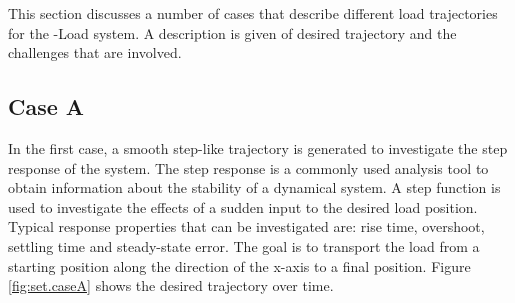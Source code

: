 
This section discusses a number of cases that describe different load trajectories for the -Load system.
A description is given of desired trajectory and the challenges that are involved.

\subsection*{Case A}



In the first case, a smooth step-like trajectory is generated to investigate the step response of the system.
The step response is a commonly used analysis tool to obtain information about the stability of a dynamical system.
A step function is used to investigate the effects of a sudden input to the desired load position.
Typical response properties that can be investigated are: rise time, overshoot, settling time and steady-state error.
The goal is to transport the load from a starting position along the direction of the x-axis to a final position. 
Figure \ref{fig:set.caseA} shows the desired trajectory over time.

